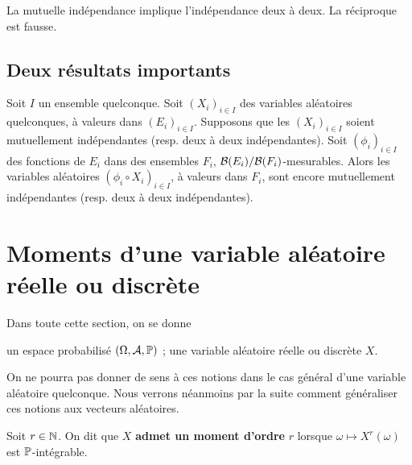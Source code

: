 \documentclass[../integ-proba.tex]{subfiles}
\begin{document}
    \begin{prop}
        La mutuelle indépendance implique l'indépendance deux à deux.
        La réciproque est fausse.
    \end{prop}


    \subsection{Deux résultats importants}

    \begin{thm}
        Soit $I$ un ensemble quelconque.
        Soit $\left( X_i \right)_{i \in I}$ des variables aléatoires quelconques, à valeurs dans $\left( E_i\right)_{i \in I}$.
        Supposons que les $\left( X_i \right)_{i \in I}$ soient mutuellement indépendantes (resp. deux à deux indépendantes).
        Soit $\left( \phi_i \right)_{i \in I}$ des fonctions de $E_i$ dans des ensembles $F_i$, $\mathcal{B}(E_i)/\mathcal{B}(F_i)$-mesurables.
        Alors les variables aléatoires $\left( \phi_i \circ X_i \right)_{i \in I}$, à valeurs dans $F_i$, sont encore mutuellement indépendantes (resp. deux à deux indépendantes).
    \end{thm}

    \begin{thm}
    \end{thm}

    \section{Moments d'une variable aléatoire réelle ou discrète}

    Dans toute cette section, on se donne
    \begin{itemize}
        \itemb un espace probabilisé $\left(\Omega, \mathcal{A}, \mathbb{P}\right)$ ;
        \itemb une variable aléatoire réelle ou discrète $X$.
    \end{itemize}

    On ne pourra pas donner de sens à ces notions dans le cas général d'une variable aléatoire quelconque.
    Nous verrons néanmoins par la suite comment généraliser ces notions aux vecteurs aléatoires.

    \begin{defi}
        Soit $r\in\mathbb{N}$.
        On dit que $X$ \textbf{admet un moment d'ordre} $r$ lorsque $\omega \mapsto X^r(\omega)$ est $\mathbb{P}$-intégrable.
    \end{defi}
\end{document}
